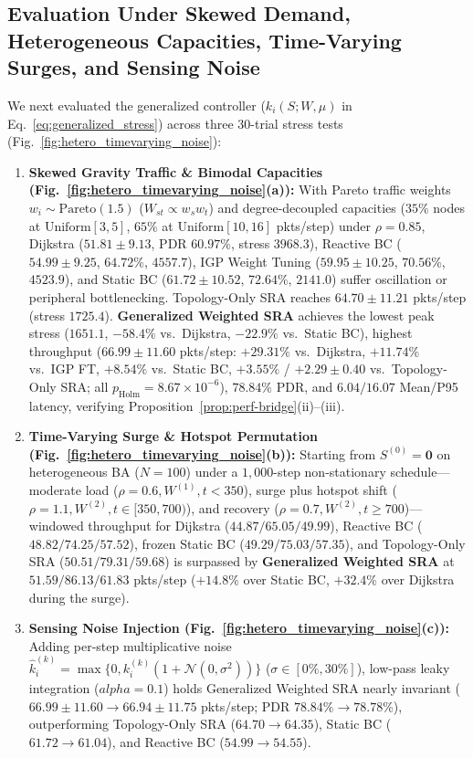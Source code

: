 \documentclass{ccjnl}
\newcommand{\rev}[1]{#1}
\def\rev#1{#1}%
\def\widetilde#1{#1}%
\def\kappa{k}%
\def\alpha{alpha}%
\begin{document}
\rev{\subsection{Evaluation Under Skewed Demand, Heterogeneous Capacities, Time-Varying Surges, and Sensing Noise}
\label{subsec:hetero_noise_eval}

We next evaluated the generalized controller ($\widetilde{\kappa}_i(S;W,\mu)$ in Eq.~\eqref{eq:generalized_stress}) across three 30-trial stress tests (Fig.~\ref{fig:hetero_timevarying_noise}):
\begin{enumerate}
    \item \textbf{Skewed Gravity Traffic \& Bimodal Capacities (Fig.~\ref{fig:hetero_timevarying_noise}(a)):} With Pareto traffic weights $w_i \sim \mathrm{Pareto}(1.5)$ ($W_{st} \propto w_s w_t$) and degree-decoupled capacities ($35\%$ nodes at $\mathrm{Uniform}[3, 5]$, $65\%$ at $\mathrm{Uniform}[10, 16]$ pkts/step) under $\rho=0.85$, Dijkstra ($51.81 \pm 9.13$, PDR $60.97\%$, stress $3968.3$), Reactive BC ($54.99 \pm 9.25$, $64.72\%$, $4557.7$), IGP Weight Tuning ($59.95 \pm 10.25$, $70.56\%$, $4523.9$), and Static BC ($61.72 \pm 10.52$, $72.64\%$, $2141.0$) suffer oscillation or peripheral bottlenecking. Topology-Only SRA reaches $64.70 \pm 11.21$ pkts/step (stress $1725.4$). \textbf{Generalized Weighted SRA} achieves the lowest peak stress ($\mathbf{1651.1}$, $-58.4\%$ vs.\ Dijkstra, $-22.9\%$ vs.\ Static BC), highest throughput ($\mathbf{66.99 \pm 11.60}$ pkts/step: $+29.31\%$ vs.\ Dijkstra, $+11.74\%$ vs.\ IGP FT, $+8.54\%$ vs.\ Static BC, $+3.55\%$ / $+2.29 \pm 0.40$ vs.\ Topology-Only SRA; all $p_{\text{Holm}} = 8.67 \times 10^{-6}$), $\mathbf{78.84\%}$ PDR, and $6.04/16.07$ Mean/P95 latency, verifying Proposition~\ref{prop:perf-bridge}(ii)--(iii).
    \item \textbf{Time-Varying Surge \& Hotspot Permutation (Fig.~\ref{fig:hetero_timevarying_noise}(b)):} Starting from $S^{(0)}=\mathbf{0}$ on heterogeneous BA ($N=100$) under a $1{,}000$-step non-stationary schedule—moderate load ($\rho=0.6, W^{(1)}, t<350$), surge plus hotspot shift ($\rho=1.1, W^{(2)}, t\in[350,700)$), and recovery ($\rho=0.7, W^{(2)}, t\ge 700$)—windowed throughput for Dijkstra ($44.87/65.05/49.99$), Reactive BC ($48.82/74.25/57.52$), frozen Static BC ($49.29/75.03/57.35$), and Topology-Only SRA ($50.51/79.31/59.68$) is surpassed by \textbf{Generalized Weighted SRA} at $\mathbf{51.59/86.13/61.83}$ pkts/step ($+14.8\%$ over Static BC, $+32.4\%$ over Dijkstra during the surge).
    \item \textbf{Sensing Noise Injection (Fig.~\ref{fig:hetero_timevarying_noise}(c)):} Adding per-step multiplicative noise $\hat{\kappa}_i^{(k)} = \max\{0, \widetilde{\kappa}_i^{(k)}(1 + \mathcal{N}(0, \sigma^2))\}$ ($\sigma \in [0\%, 30\%]$), low-pass leaky integration ($\alpha=0.1$) holds Generalized Weighted SRA nearly invariant ($66.99 \pm 11.60 \to \mathbf{66.94 \pm 11.75}$ pkts/step; PDR $78.84\% \to 78.78\%$), outperforming Topology-Only SRA ($64.70 \to 64.35$), Static BC ($61.72 \to 61.04$), and Reactive BC ($54.99 \to 54.55$).
\end{enumerate}}
\end{document}
